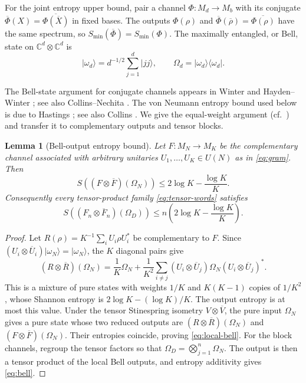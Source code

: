 \documentclass[11pt]{article}
\numberwithin{equation}{section}
\newtheorem{lemma}[theorem]{Lemma}
\theoremstyle{boldremark}\newtheorem{remark}[theorem]{Remark}
\newcommand{\C}{\mathbb C}
\newcommand{\M}{M}
\newcommand{\smin}{S_{\min}}
\newcommand{\ket}[1]{\lvert #1\rangle}
\newcommand{\bra}[1]{\langle #1\rvert}
\begin{document}
For the joint entropy upper bound, pair a channel $\Phi:\M_d\to\M_b$
with its conjugate $\overline\Phi(X)=\overline{\Phi(\overline X)}$
in fixed bases. The outputs $\Phi(\rho)$ and
$\overline\Phi(\overline\rho)=\overline{\Phi(\rho)}$ have the same
spectrum, so $\smin(\overline\Phi)=\smin(\Phi)$. The maximally entangled, or Bell,
state on $\C^d\otimes\C^d$ is
\[
 \ket{\omega_d}=d^{-1/2}\sum_{j=1}^d\ket{jj},
 \qquad\Omega_d=\ket{\omega_d}\bra{\omega_d}.
\]

The Bell-state argument for conjugate channels appears in Winter
\cite[Lemma~1]{Winter} and Hayden--Winter \cite[Lemma~II.1]{HW}; see also
Collins--Nechita \cite[Section~6.1]{CN}.
The von Neumann entropy bound used below is due to Hastings
\cite[Eq.~(10) and Supplemental Lemma~1]{Hastings}; see also
Collins \cite[Proposition~3.2]{Collins}.
We give the equal-weight argument (cf.\ \cite[Theorem~4.1]{CY})
and transfer it to complementary outputs and tensor blocks.

\begin{lemma}[Bell-output entropy bound]\label{lem:bell}
Let $F:\M_N\to\M_K$ be the complementary channel associated with
arbitrary unitaries $U_1,\ldots,U_K\in U(N)$ as in \eqref{eq:gram}.
Then
\begin{equation}
 S((F\otimes\overline F)(\Omega_N))
 \le2\log K-\frac{\log K}{K}.
 \label{eq:local-bell}
\end{equation}
Consequently every tensor-product family \eqref{eq:tensor-words} satisfies
\begin{equation}
 S((F_n\otimes\overline F_n)(\Omega_D))
 \le n\left(2\log K-\frac{\log K}{K}\right).
 \label{eq:bell}
\end{equation}
\end{lemma}
\begin{proof}
Let $R(\rho)=K^{-1}\sum_iU_i\rho U_i^*$ be complementary to $F$.
Since $(U_i\otimes\overline U_i)\ket{\omega_N}=\ket{\omega_N}$,
the $K$ diagonal pairs give
\[
 (R\otimes\overline R)(\Omega_N)
 =\frac1K\Omega_N+\frac1{K^2}\sum_{i\ne j}
 (U_i\otimes\overline U_j)\Omega_N(U_i\otimes\overline U_j)^*.
\]
This is a mixture of pure states with weights $1/K$ and
$K(K-1)$ copies of $1/K^2$, whose Shannon entropy is
$2\log K-(\log K)/K$. The output entropy is at most this value.
Under the tensor Stinespring isometry $V\otimes\overline V$,
the pure input $\Omega_N$ gives a pure state whose two reduced
outputs are $(R\otimes\overline R)(\Omega_N)$ and
$(F\otimes\overline F)(\Omega_N)$. Their entropies coincide,
proving \eqref{eq:local-bell}.
For the block channels, regroup the tensor factors so that
$\Omega_D=\bigotimes_{j=1}^n\Omega_N$. The output is then a tensor
product of the local Bell outputs, and entropy additivity gives
\eqref{eq:bell}.
\end{proof}
\end{document}

